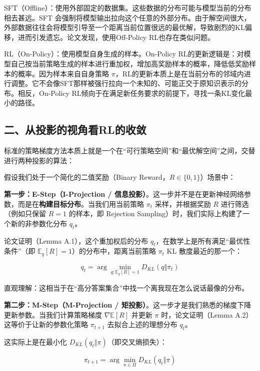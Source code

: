 SFT（Offline）：使用外部固定的数据集。这些数据的分布可能与模型当前的分布相去甚远。SFT 会强制将模型输出拉向这个任意的外部分布。由于解空间很大，外部数据往往会将模型引导至一个距离当前位置很远的最优解，导致剧烈的KL偏移，进而引发遗忘。论文发现，使用Off-Policy RL也存在类似问题。

RL（On-Policy）：使用模型自身生成的样本。On-Policy RL的更新逻辑是：对模型自己按当前策略生成的样本进行重加权，增加高奖励样本的概率，降低低奖励样本的概率。因为样本来自自身策略 \(\pi\)，RL的更新本质上是在当前分布的邻域内进行调整。它不会像SFT那样被强行拉向一个未知的、可能正交于原知识表示的分布。相反，On-Policy RL倾向于在满足新任务要求的前提下，寻找一条KL变化最小的路径。

\hypertarget{ux4e8cux4eceux6295ux5f71ux7684ux89c6ux89d2ux770brlux7684ux6536ux655b}{%
\subsection{二、从投影的视角看RL的收敛}\label{ux4e8cux4eceux6295ux5f71ux7684ux89c6ux89d2ux770brlux7684ux6536ux655b}}

标准的策略梯度方法本质上就是一个在``可行策略空间''和``最优解空间''之间，交替进行两种投影的算法：

假设我们处于一个简化的二值奖励（Binary Reward，\(R \in \{0,1\}\)）场景中：

\textbf{第一步：E-Step（I-Projection / 信息投影）}。这一步并不是在更新神经网络参数，而是在\textbf{构建目标分布}。当我们用当前策略 \(\pi_t\) 采样，并根据奖励 \(R\) 进行筛选（例如只保留 \(R=1\) 的样本，即 Rejection Sampling）时，我们实际上构建了一个新的非参数化分布 \(q_t\)。

论文证明（Lemma A.1），这个重加权后的分布 \(q_t\)，在数学上是所有满足``最优性条件''（即 \(\mathbb{E}_q[R]=1\)）的分布中，距离当前策略 \(\pi_t\) KL 散度最近的那一个：

\[
q_t = \arg\min_{q:\mathbb{E}_q[R]=1} D_{KL}(q\Vert \pi_t)
\]

直观理解：这相当于在``高分答案集合''中找一个离我现在怎么说话最像的分布。

\textbf{第二步：M-Step（M-Projection / 矩投影）}。这一步才是我们熟悉的梯度下降更新参数。当我们计算策略梯度 \(\nabla \mathbb{E}[R]\) 并更新 \(\pi\) 时，论文证明（Lemma A.2）这等价于让新的参数化策略 \(\pi_{t+1}\) 去拟合上述的理想分布 \(q_t\)。

这实际上是在最小化 \(D_{KL}(q_t\Vert \pi)\)（即交叉熵损失）：

\[
\pi_{t+1} = \arg\min_{\pi\in\Pi} D_{KL}(q_t\Vert \pi)
\]

